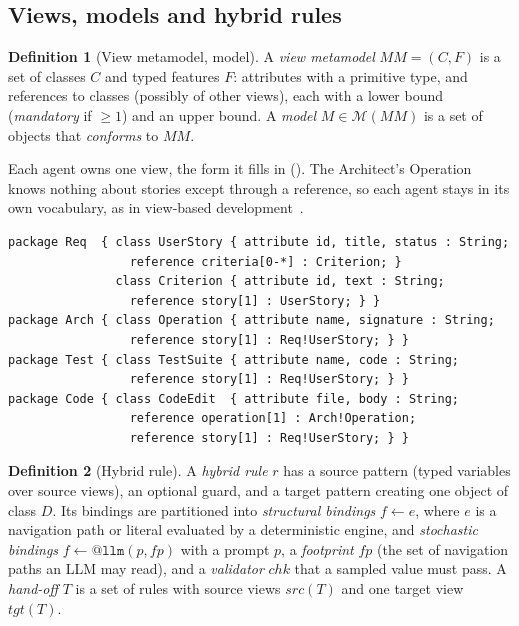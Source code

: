 \documentclass[10pt,conference]{IEEEtran}
\theoremstyle{definition}
\newtheorem{definition}{Definition}
\newcommand{\devteam}{\textsc{DevTeam}}
\newcommand{\MM}{\mathit{MM}}
\newcommand{\Mods}[1]{\mathcal{M}(#1)}
\newcommand{\cls}[1]{\textsf{#1}}
\newcommand{\code}[1]{\texttt{#1}}
\newcommand{\fp}{\mathit{fp}}
\begin{document}
\subsection{Views, models and hybrid rules}

\begin{definition}[View metamodel, model]\label{def:mm}
A \emph{view metamodel} $\MM=(C,F)$ is a set of classes $C$ and typed
features $F$: attributes with a primitive type, and references to classes
(possibly of other views), each with a lower bound (\emph{mandatory} if
$\ge 1$) and an upper bound. A \emph{model} $M\in\Mods{\MM}$ is a set of
objects that \emph{conforms} to $\MM$.
\end{definition}

Each agent owns one view, the form it fills in (). The
Architect's \cls{Operation} knows nothing about stories except through a
reference, so each agent stays in its own vocabulary, as in view-based
development~\cite{klare2021vitruvius,bruneliere2019views}.

\begin{lstlisting}[language=KM3, caption={View metamodels of \devteam{} (KM3-like).}, label={lst:views}]
package Req  { class UserStory { attribute id, title, status : String;
                 reference criteria[0-*] : Criterion; }
               class Criterion { attribute id, text : String;
                 reference story[1] : UserStory; } }
package Arch { class Operation { attribute name, signature : String;
                 reference story[1] : Req!UserStory; } }
package Test { class TestSuite { attribute name, code : String;
                 reference story[1] : Req!UserStory; } }
package Code { class CodeEdit  { attribute file, body : String;
                 reference operation[1] : Arch!Operation;
                 reference story[1] : Req!UserStory; } }
\end{lstlisting}

\begin{definition}[Hybrid rule]\label{def:rule}
A \emph{hybrid rule} $r$ has a source pattern (typed variables over
source views), an optional guard, and a target pattern creating one object of
class $D$. Its bindings are partitioned into \emph{structural bindings}
$f\leftarrow e$, where $e$ is a navigation path or literal evaluated by a
deterministic engine, and \emph{stochastic bindings}
$f\leftarrow\code{@llm}(p,\fp)$ with a prompt $p$, a \emph{footprint} $\fp$
(the set of navigation paths an LLM may read), and a \emph{validator}
$\mathit{chk}$ that a sampled value must pass. A \emph{hand-off} $T$ is a set
of rules with source views $\mathit{src}(T)$ and one target view
$\mathit{tgt}(T)$.
\end{definition}
\end{document}
